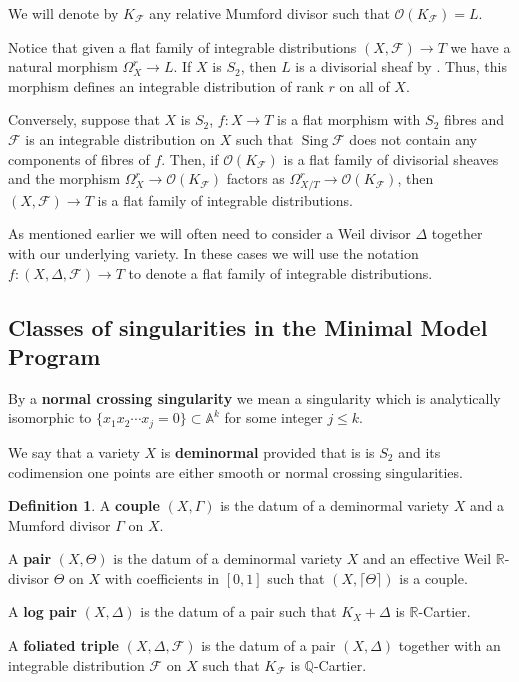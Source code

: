 \documentclass[12pt, a4paper]{amsart}
\DeclareMathOperator{\sing}{Sing}
\theoremstyle{definition}
\newtheorem{definition}[theorem]{Definition}
\theoremstyle{named}
\begin{document}
We will denote by $K_{\mathcal F}$ any relative Mumford divisor such that $\mathcal O(K_{\mathcal F}) = L$.


Notice that given a flat family of integrable distributions $(X, \mathcal F) \rightarrow T$
we have a natural morphism 
$\Omega^r_X \rightarrow L$.  If $X$ is $S_2$, then $L$ is a divisorial sheaf by \cite[Proposition 3.5]{MR2047697}.  Thus, this morphism defines an integrable distribution of rank $r$ on all of $X$.


  

Conversely, suppose that $X$ is $S_2$, $f\colon X \rightarrow T$
is a flat morphism with $S_2$ fibres and $\mathcal F$ is an integrable distribution on $X$ such that $\sing \mathcal F$ does not contain any components of fibres of $f$.  Then, if 
$\mathcal O(K_{\mathcal F})$ is a flat family of divisorial sheaves and the morphism $\Omega^r_X \to \mathcal O(K_{\mathcal F})$ factors 
as $\Omega^r_{X/T} \to \mathcal O(K_{\mathcal F})$, then $(X, \mathcal F) \to T$ is a flat family 
of integrable distributions.


As mentioned earlier we will often need to consider a Weil divisor $\Delta$ together with our underlying variety.  
In these cases we will use the notation $f\colon (X, \Delta, \mathcal F) \rightarrow T$ to denote a flat family of integrable distributions.



\subsection{Classes of singularities in the Minimal Model Program}
\label{s_singularities}

By a {\bf normal crossing singularity} we mean a singularity which is analytically isomorphic to 
$\{x_1x_2\cdots x_j = 0\} \subset \mathbb A^k$ 
for some integer 
$j \leq k$.


We say that a variety $X$ is {\bf deminormal} provided that is is $S_2$ and its codimension one points 
are either smooth or normal crossing singularities.





\begin{definition}
    \label{def.pair}
A {\bf couple} 
$(X, \Gamma)$ 
is the datum of a deminormal variety 
$X$ 
and a Mumford divisor 
$\Gamma$
on 
$X$.


A {\bf pair} 
$(X, \Theta)$ 
is the datum of a deminormal variety 
$X$ 
and an effective Weil 
$\mathbb R$-divisor 
$\Theta$ 
on 
$X$
with coefficients in 
$[0, 1]$
such that 
$(X, \lceil \Theta \rceil)$
is a couple.

A {\bf log pair} 
$(X, \Delta)$ 
is the datum of a pair such that 
$K_X+\Delta$ 
is 
$\mathbb R$-Cartier.

A {\bf foliated triple} 
$(X, \Delta, \mathcal F)$
is the datum of a pair
$(X, \Delta)$
together with an integrable distribution 
$\mathcal F$
on 
$X$ such that $K_{\mathcal F}$ is $\mathbb Q$-Cartier.
\end{definition}
\end{document}
